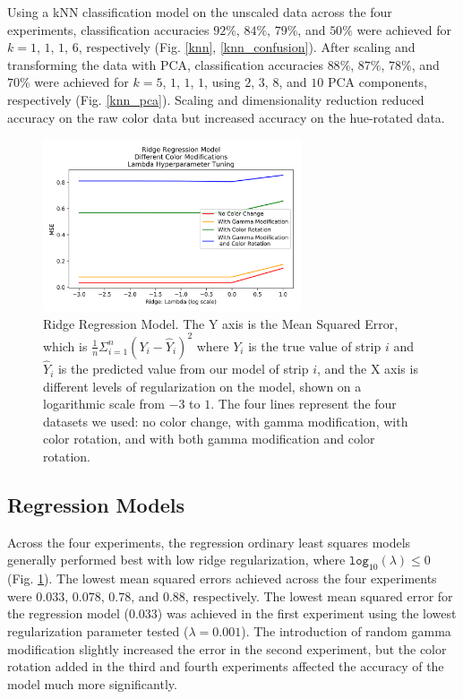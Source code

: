 \documentclass[journal]{IEEEtran}
\begin{document}
Using a kNN classification model on the unscaled data across the four experiments, classification accuracies $92\%$, $84\%$, $79\%$, and $50\%$ were achieved for $k=1$, $1$, $1$, $6$, respectively (Fig. \ref{knn}, \ref{knn_confusion}). After scaling and transforming the data with PCA, classification accuracies $88\%$, $87\%$, $78\%$, and $70\%$ were achieved for $k=5$, $1$, $1$, $1$, using $2$, $3$, $8$, and $10$ PCA components, respectively (Fig. \ref{knn_pca}). Scaling and dimensionality reduction reduced accuracy on the raw color data but increased accuracy on the hue-rotated data.

\begin{figure}
\centering
\includegraphics[height=2in]{Ridge/ridge_regression3.png}
\caption{Ridge Regression Model. The Y axis is the Mean Squared Error, which is $\frac{1}{n} \Sigma_{i=1}^n (Y_i - \hat{Y}_i)^2$ where $Y_i$ is the true value of strip $i$ and $\hat{Y}_i$ is the predicted value from our model of strip $i$, and the X axis is different levels of regularization on the model, shown on a logarithmic scale from $-3$ to $1$. The four lines represent the four datasets we used: no color change, with gamma modification, with color rotation, and with both gamma modification and color rotation.}
\label{ridge}
\end{figure}

\subsection{Regression Models}

Across the four experiments, the regression ordinary least squares models generally performed best with low ridge regularization, where $\texttt{log}_{10}(\lambda) \leq 0$  (Fig. \ref{ridge}). The lowest mean squared errors achieved across the four experiments were $0.033$, $0.078$, $0.78$, and $0.88$, respectively. The lowest mean squared error for the regression model ($0.033$) was achieved in the first experiment using the lowest regularization parameter tested ($\lambda = 0.001$). The introduction of random gamma modification slightly increased the error in the second experiment, but the color rotation added in the third and fourth experiments affected the accuracy of the model much more significantly.
\end{document}
